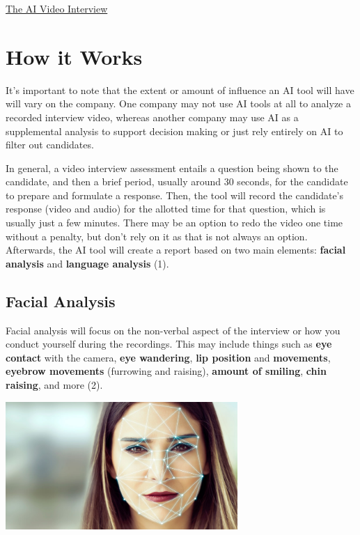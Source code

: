 \documentclass[
]{book}
\begin{document}
\href{https://www.youtube.com/watch?v=cJkHft032OE}{The AI Video Interview}

\hypertarget{how-it-works}{%
\section{How it Works}\label{how-it-works}}

It's important to note that the extent or amount of influence an AI tool will have will vary on the company. One company may not use AI tools at all to analyze a recorded interview video, whereas another company may use AI as a supplemental analysis to support decision making or just rely entirely on AI to filter out candidates.

In general, a video interview assessment entails a question being shown to the candidate, and then a brief period, usually around 30 seconds, for the candidate to prepare and formulate a response. Then, the tool will record the candidate's response (video and audio) for the allotted time for that question, which is usually just a few minutes. There may be an option to redo the video one time without a penalty, but don't rely on it as that is not always an option. Afterwards, the AI tool will create a report based on two main elements: \textbf{facial analysis} and \textbf{language analysis} (1).~

\hypertarget{facial-analysis}{%
\subsection{Facial Analysis}\label{facial-analysis}}

Facial analysis will focus on the non-verbal aspect of the interview or how you conduct yourself during the recordings. This may include things such as \textbf{eye contact} with the camera, \textbf{eye wandering}, \textbf{lip position} and \textbf{movements}, \textbf{eyebrow movements} (furrowing and raising), \textbf{amount of smiling}, \textbf{chin raising}, and more (2).

\includegraphics[width=3.46875in,height=\textheight]{Facial_Analysis.png}
\end{document}

